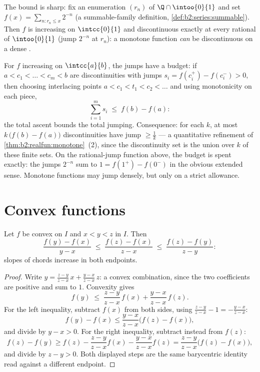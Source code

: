 \begin{example}
The bound is sharp: fix an enumeration $(r_n)$ of $\Q \cap
\intoo{0}{1}$ and set $f(x) = \sum_{n : r_n \leq x} 2^{-n}$
(a summable-family definition,
\cref{def:b2:series:summable}). Then $f$ is increasing on
$\intcc{0}{1}$ and discontinuous exactly at every rational of
$\intoo{0}{1}$ (jump $2^{-n}$ at $r_n$): a monotone function
\emph{can} be discontinuous on a dense .
\end{example}

\begin{example}\label{ex:b2:realfun:jumpbudget}
For $f$ increasing on $\intcc{a}{b}$, the jumps have a budget:
if $a < c_1 < \dots < c_m < b$ are discontinuities with jumps
$s_i = f(c_i^+) - f(c_i^-) > 0$, then choosing interlacing
points $a < c_1 < t_1 < c_2 < \dots$ and using monotonicity on
each piece,
\[
\sum_{i=1}^{m} s_i \;\leq\; f(b) - f(a) :
\]
the total ascent bounds the total jumping. Consequence: for
each $k$, at most $k\,\bigl(f(b) - f(a)\bigr)$ discontinuities
have jump $\geq \frac1k$ --- a quantitative refinement of
\cref{thm:b2:realfun:monotone}~(2), since the discontinuity set
is the  union over $k$ of these finite sets. On the
rational-jump function above, the budget is spent exactly:
the jumps $2^{-n}$ sum to $1 = f(1^+) - f(0^-)$ in the obvious
extended sense. Monotone functions may jump densely, but only
on a strict allowance.
\end{example}

\section{Convex functions}

\begin{lemma}\label{lem:b2:realfun:slopes}
Let $f$ be convex on $I$ and $x < y < z$ in $I$. Then
\[
\frac{f(y) - f(x)}{y - x}
\;\leq\; \frac{f(z) - f(x)}{z - x}
\;\leq\; \frac{f(z) - f(y)}{z - y} :
\]
slopes of chords increase in both endpoints.
\end{lemma}

\begin{proof}
Write $y = \frac{z - y}{z - x}\,x + \frac{y - x}{z - x}\,z$: a
convex combination, since the two coefficients are positive and
sum to $1$. Convexity gives
\[
f(y) \;\leq\; \frac{z-y}{z-x}\,f(x) + \frac{y-x}{z-x}\,f(z).
\]
For the left inequality, subtract $f(x)$ from both sides, using
$\frac{z-y}{z-x} - 1 = -\frac{y-x}{z-x}$:
\[
f(y) - f(x) \leq \frac{y - x}{z - x}\bigl(f(z) - f(x)\bigr),
\]
and divide by $y - x > 0$. For the right inequality, subtract
instead from $f(z)$:
\[
f(z) - f(y) \geq f(z) - \frac{z-y}{z-x}f(x) -
\frac{y-x}{z-x}f(z)
= \frac{z - y}{z - x}\bigl(f(z) - f(x)\bigr),
\]
and divide by $z - y > 0$. Both displayed steps are the same
barycentric identity read against a different endpoint.
\end{proof}

